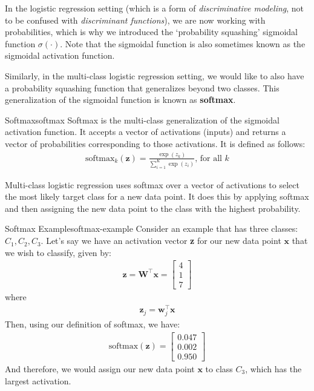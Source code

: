 In the logistic regression setting (which is a form of \textit{discriminative modeling}, not to be confused with \textit{discriminant functions}), we are now working with probabilities, which is why we introduced the `probability squashing' sigmoidal function $\sigma(\cdot)$. Note that the sigmoidal function is also sometimes known as the sigmoidal activation function.

Similarly, in the multi-class logistic regression setting, we would like to also have a probability squashing function that generalizes beyond two classes. This generalization of the sigmoidal function is known as \textbf{softmax}.

\begin{definition}{Softmax}{softmax}
Softmax is the multi-class generalization of the sigmoidal activation function. It accepts a vector of activations (inputs) and returns a vector of probabilities corresponding to those activations. It is defined as follows:
\begin{align*}
	\text{softmax}_{k}(\textbf{z}) = \frac{\exp{(z_{k})}}{\sum_{i=1}^{K} \exp{(z_{i})}}\text{, for all $k$}
\end{align*}
\end{definition}

Multi-class logistic regression uses softmax over a vector of activations to select the most likely target class for a new data point. It does this by applying softmax and then assigning the new data point to the class with the highest probability.

\begin{example}{Softmax Example}{softmax-example}
	Consider an example that has three classes: $C_{1}, C_{2}, C_{3}$. Let's say we have an activation vector \textbf{z} for our new data point $\textbf{x}$ that we wish to classify, given by:
	\begin{align*}
		\textbf{z} = \textbf{W}^\top\textbf{x} =
			\begin{bmatrix}
		    	4 \\
		        1 \\
		        7
		    \end{bmatrix}
	\end{align*}
	where
	\begin{align*}
		\textbf{z}_{j} = \textbf{w}_{j}^\top\textbf{x}
	\end{align*}
	Then, using our definition of softmax, we have:
	\begin{align*}
		\text{softmax}(\textbf{z}) =
			\begin{bmatrix}
				0.047 \\
				0.002 \\
				0.950
		    \end{bmatrix}
	\end{align*}
	And therefore, we would assign our new data point $\textbf{x}$ to class $C_{3}$, which has the largest activation.
\end{example}

